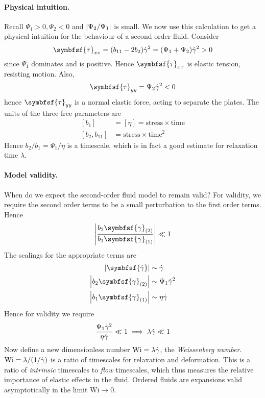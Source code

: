 \documentclass{jknotes}
\begin{document}
\paragraph{Physical intuition.}
Recall $\Psi_1 > 0, \Psi_2 < 0$ and $\abs{\Psi_2/\Psi_1}$ is small. We now use
this calculation to get a physical intuition for the behaviour of a second
order fluid. Consider
\begin{equation}
	\symbfsf{\tau}_{xx} = (b_{11} - 2b_2) \srate^2 = (\Psi_1 + \Psi_2)
	\srate^2 > 0
\end{equation}
since $\Psi_1$ dominates and is positive. Hence $\symbfsf{\tau}_{xx}$ is
elastic tension, resisting motion. Also,
\begin{equation}
	\symbfsf{\tau}_{yy} = \Psi_2 \srate^2 < 0
\end{equation}
hence $\symbfsf{\tau}_{yy}$ is a normal elastic force, acting to separate the
plates. The units of the three free parameters are
\begin{align}
	\left[ b_1\right] &= \left[ \eta \right] = \text{stress} \times \text{time}
	\\
	\left[b_2, b_{11} \right] &= \text{stress} \times \text{time}^2
\end{align}
Hence $b_2/b_1 = \Psi_1 / \eta$ is a timescale, which is in fact a good
estimate for relaxation time $\lambda$.

\paragraph{Model validity.}
When do we expect the second-order fluid model to remain valid? For validity,
we require the second order terms to be a small perturbation to the first
order terms. Hence
\begin{equation}
	\abs{\frac{b_2 \symbfsf{\gamma}_{(2)}}{b_1 \symbfsf{\gamma}_{(1)}}} \ll 1
\end{equation}
The scalings for the appropriate terms are
\begin{align}
	\abs{\symbfsf{\srate}} &\sim \srate\\
	\abs{b_2 \symbfsf{\gamma}_{(2)}} &\sim \Psi_1 \srate^2 \\
	\abs{b_1 \symbfsf{\gamma}_{(1)}} &\sim \eta \srate
\end{align}
Hence for validity we require
\begin{equation}
	\frac{\Psi_1 \dot{\gamma}^2}{\eta \dot{\gamma}} \ll 1 \implies \lambda \dot{\gamma} \ll 1
\end{equation}
Now define a new dimensionless number $\text{Wi} = \lambda \dot{\gamma}$, the
\emph{Weissenberg number}. $\text{Wi} = \lambda / (1/\dot{\gamma})$ is a ratio of
timescales for relaxation and deformation. This is a ratio of \emph{intrinsic}
timescales to \emph{flow} timescales, which thus measures the relative
importance of elastic effects in the fluid.  Ordered fluids are expansions
valid asymptotically in the limit $\text{Wi} \to 0$.
\end{document}
